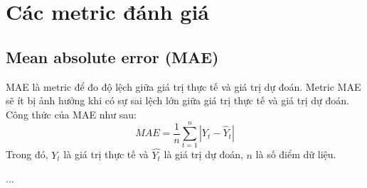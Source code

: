 \section{Các metric đánh giá}
\subsection{Mean absolute error (MAE)} \label{2_4}
MAE là metric để đo độ lệch giữa giá trị thực tế và giá trị dự đoán. Metric MAE sẽ ít bị ảnh hưởng khi có sự sai lệch lớn giữa giá trị thực tế và giá trị dự đoán. Công thức của MAE như sau:
\begin{equation}
MAE=\frac{1}{n}\sum_{t=1}^{n}|Y_{t}-\hat{Y}_{t}|
\label{mae}
\end{equation}
Trong đó, $Y_t$ là giá trị thực tế và $\hat{Y_t}$ là giá trị dự đoán, $n$ là số điểm dữ liệu.

...
